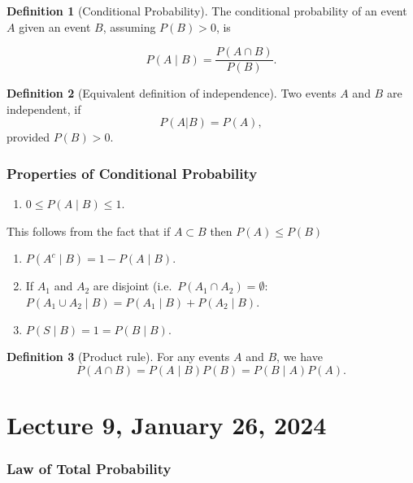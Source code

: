 \documentclass[
]{book}
\providecommand{\tightlist}{%
  \setlength{\itemsep}{0pt}\setlength{\parskip}{0pt}}
\theoremstyle{definition}
\newtheorem{definition}{Definition}[chapter]
\theoremstyle{definition}
\theoremstyle{definition}
\theoremstyle{definition}
\theoremstyle{remark}
\begin{document}
\begin{definition}[Conditional Probability]
The conditional probability of an event \(A\) given an event \(B\), assuming \(P(B)>0\), is

\[
  P(A \mid B) = \frac{P(A\cap B)}{P(B)}.
\]
\end{definition}

\begin{definition}[Equivalent definition of independence]
Two events \(A\) and \(B\) are independent, if
\[
P(A|B)=P(A),
\]
provided \(P(B)>0\).
\end{definition}

\hypertarget{properties-of-conditional-probability}{%
\subsection{Properties of Conditional Probability}\label{properties-of-conditional-probability}}

\begin{enumerate}
\def\labelenumi{\arabic{enumi}.}
\tightlist
\item
  \(0 \le P(A \mid B) \le 1\).
\end{enumerate}

This follows from the fact that if \(A \subset B\) then \(P(A) \le P(B)\)

\begin{enumerate}
\def\labelenumi{\arabic{enumi}.}
\setcounter{enumi}{1}
\item
  \(P(A^c \mid B) = 1-P(A \mid B)\).
\item
  If \(A_1\) and \(A_2\) are disjoint (i.e.~\(P(A_1\cap A_2)=\emptyset\): \(P(A_1 \cup A_2 \mid B) = P(A_1 \mid B) + P(A_2 \mid B)\).
\item
  \(P(S \mid B)= 1 = P(B \mid B)\).
\end{enumerate}

\begin{definition}[Product rule]
For any events \(A\) and \(B\), we have
\[
P(A\cap B) = P(A\mid B) P(B)  = P(B \mid A) P(A).
\]
\end{definition}

\hypertarget{lecture-9-january-26-2024}{%
\chapter{Lecture 9, January 26, 2024}\label{lecture-9-january-26-2024}}

\hypertarget{law-of-total-probability}{%
\subsection{Law of Total Probability}\label{law-of-total-probability}}
\end{document}
